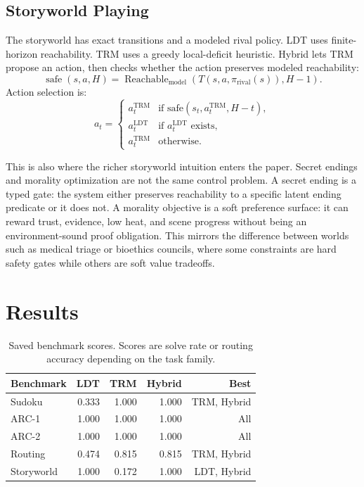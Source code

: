 \documentclass[11pt]{article}
\begin{document}
\subsection{Storyworld Playing}

The storyworld has exact transitions and a modeled rival policy. LDT uses finite-horizon reachability. TRM uses a greedy local-deficit heuristic. Hybrid lets TRM propose an action, then checks whether the action preserves modeled reachability:
\[
  \operatorname{safe}(s,a,H)
  =
  \operatorname{Reachable}_{\text{model}}(T(s,a,\pi_{\text{rival}}(s)),H-1).
\]
Action selection is:
\[
a_t =
\begin{cases}
a^{\text{TRM}}_t & \text{if safe}(s_t,a^{\text{TRM}}_t,H-t),\\
a^{\text{LDT}}_t & \text{if } a^{\text{LDT}}_t \text{ exists},\\
a^{\text{TRM}}_t & \text{otherwise.}
\end{cases}
\]

This is also where the richer storyworld intuition enters the paper. Secret endings and morality optimization are not the same control problem. A secret ending is a typed gate: the system either preserves reachability to a specific latent ending predicate or it does not. A morality objective is a soft preference surface: it can reward trust, evidence, low heat, and scene progress without being an environment-sound proof obligation. This mirrors the difference between worlds such as medical triage or bioethics councils, where some constraints are hard safety gates while others are soft value tradeoffs.

\section{Results}

\begin{table}[t]
\centering
\begin{tabular}{lrrrr}
\toprule
Benchmark & LDT & TRM & Hybrid & Best \\
\midrule
Sudoku & 0.333 & 1.000 & 1.000 & TRM, Hybrid \\
ARC-1 & 1.000 & 1.000 & 1.000 & All \\
ARC-2 & 1.000 & 1.000 & 1.000 & All \\
Routing & 0.474 & 0.815 & 0.815 & TRM, Hybrid \\
Storyworld & 1.000 & 0.172 & 1.000 & LDT, Hybrid \\
\bottomrule
\end{tabular}
\caption{Saved benchmark scores. Scores are solve rate or routing accuracy depending on the task family.}
\label{tab:results}
\end{table}
\end{document}
